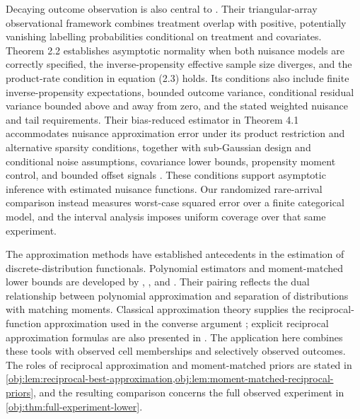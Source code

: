 Decaying outcome observation is also central to \citet[Theorems 2.2 and 4.1, equation (2.3)]{ZhangChakraborttyBradic2025}. Their triangular-array observational framework combines treatment overlap with positive, potentially vanishing labelling probabilities conditional on treatment and covariates. Theorem 2.2 establishes asymptotic normality when both nuisance models are correctly specified, the inverse-propensity effective sample size diverges, and the product-rate condition in equation (2.3) holds. Its conditions also include finite inverse-propensity expectations, bounded outcome variance, conditional residual variance bounded above and away from zero, and the stated weighted nuisance and tail requirements. Their bias-reduced estimator in Theorem 4.1 accommodates nuisance approximation error under its product restriction and alternative sparsity conditions, together with sub-Gaussian design and conditional noise assumptions, covariance lower bounds, propensity moment control, and bounded offset signals \citep[Assumptions 1--3 and 5--8]{ZhangChakraborttyBradic2025}. These conditions support asymptotic inference with estimated nuisance functions. Our randomized rare-arrival comparison instead measures worst-case squared error over a finite categorical model, and the interval analysis imposes uniform coverage over that same experiment.

The approximation methods have established antecedents in the estimation of discrete-distribution functionals. Polynomial estimators and moment-matched lower bounds are developed by \citet{JiaoVenkatHanWeissman2015}, \citet{Wu2016}, and \citet{WuYang2019}. Their pairing reflects the dual relationship between polynomial approximation and separation of distributions with matching moments. Classical approximation theory supplies the reciprocal-function approximation used in the converse argument \citep{Meinardus1967}; explicit reciprocal approximation formulas are also presented in \citet[Section 3]{https://doi.org/10.1007/s11075-026-02364-1}. The application here combines these tools with observed cell memberships and selectively observed outcomes. The roles of reciprocal approximation and moment-matched priors are stated in \cref{obj:lem:reciprocal-best-approximation,obj:lem:moment-matched-reciprocal-priors}, and the resulting comparison concerns the full observed experiment in \cref{obj:thm:full-experiment-lower}.


